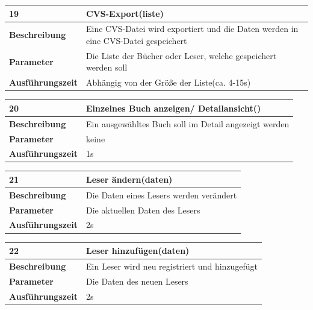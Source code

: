 \documentclass[fontsize=12pt,paper=a4,twoside]{scrartcl}
\begin{document}
\newpage
\begin{table}
	[H] \label{a19} 
	\begin{tabular}
		{|l|p{10cm}|} \hline \textbf{19} & \textbf{CVS-Export(liste)} \\
		\hline \textbf{Beschreibung} & Eine CVS-Datei wird exportiert und die Daten werden in eine CVS-Datei gespeichert\\
		\hline \textbf{Parameter} & Die Liste der Bücher oder Leser, welche gespeichert werden soll \\
		\hline \textbf{Ausführungszeit} & Abhängig von der Größe der Liste(ca. 4-15s)\\
		\hline 
	\end{tabular}
\end{table}
\begin{table}
	[H] \label{a20} 
	\begin{tabular}
		{|l|p{10cm}|} \hline \textbf{20} & \textbf{Einzelnes Buch anzeigen/ Detailansicht()} \\
		\hline \textbf{Beschreibung} & Ein ausgewähltes Buch soll im Detail angezeigt werden\\
		\hline \textbf{Parameter} & keine \\
		\hline \textbf{Ausführungszeit} & 1s\\
		\hline 
	\end{tabular}
\end{table}
\begin{table}
	[H] \label{a21} 
	\begin{tabular}
		{|l|p{10cm}|} \hline \textbf{21} & \textbf{Leser ändern(daten)} \\
		\hline \textbf{Beschreibung} & Die Daten eines Lesers werden verändert\\
		\hline \textbf{Parameter} & Die aktuellen Daten des Lesers \\
		\hline \textbf{Ausführungszeit} & 2s\\
		\hline 
	\end{tabular}
\end{table}
\begin{table}
	[H] \label{a22} 
	\begin{tabular}
		{|l|p{10cm}|} \hline \textbf{22} & \textbf{Leser hinzufügen(daten)} \\
		\hline \textbf{Beschreibung} & Ein Leser wird neu registriert und hinzugefügt\\
		\hline \textbf{Parameter} & Die Daten des neuen Lesers \\
		\hline \textbf{Ausführungszeit} & 2s\\
		\hline 
	\end{tabular}
\end{table}
\end{document}
